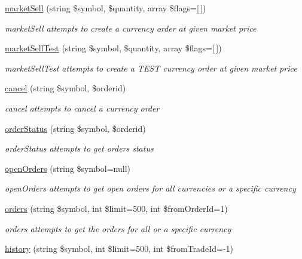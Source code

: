 \begin{DoxyCompactItemize}
\hyperlink{classBinance_1_1API_a72d07ceea281b273d65a487efc02e31e}{market\-Sell} (string \$symbol, \$quantity, array \$flags=\mbox{[}$\,$\mbox{]})
\begin{DoxyCompactList}\small\item\em market\-Sell attempts to create a currency order at given market price \end{DoxyCompactList}\item 
\hyperlink{classBinance_1_1API_a77eaa982d0ca78fbce80d6203213af28}{market\-Sell\-Test} (string \$symbol, \$quantity, array \$flags=\mbox{[}$\,$\mbox{]})
\begin{DoxyCompactList}\small\item\em market\-Sell\-Test attempts to create a T\-E\-S\-T currency order at given market price \end{DoxyCompactList}\item 
\hyperlink{classBinance_1_1API_ac49c3595190e193510eb368c0fa92992}{cancel} (string \$symbol, \$orderid)
\begin{DoxyCompactList}\small\item\em cancel attempts to cancel a currency order \end{DoxyCompactList}\item 
\hyperlink{classBinance_1_1API_ae7eae3f9588c2aee0d3c46bb9fa2ffe4}{order\-Status} (string \$symbol, \$orderid)
\begin{DoxyCompactList}\small\item\em order\-Status attempts to get orders status \end{DoxyCompactList}\item 
\hyperlink{classBinance_1_1API_a155a0a0d36ea7145f5833d9f17386335}{open\-Orders} (string \$symbol=null)
\begin{DoxyCompactList}\small\item\em open\-Orders attempts to get open orders for all currencies or a specific currency \end{DoxyCompactList}\item 
\hyperlink{classBinance_1_1API_aa1b445b6eb144e0c551fbe035737dbf8}{orders} (string \$symbol, int \$limit=500, int \$from\-Order\-Id=1)
\begin{DoxyCompactList}\small\item\em orders attempts to get the orders for all or a specific currency \end{DoxyCompactList}\item 
\hyperlink{classBinance_1_1API_a91842828e25805fe9a6fd51391566386}{history} (string \$symbol, int \$limit=500, int \$from\-Trade\-Id=-\/1)

\end{DoxyCompactItemize}
